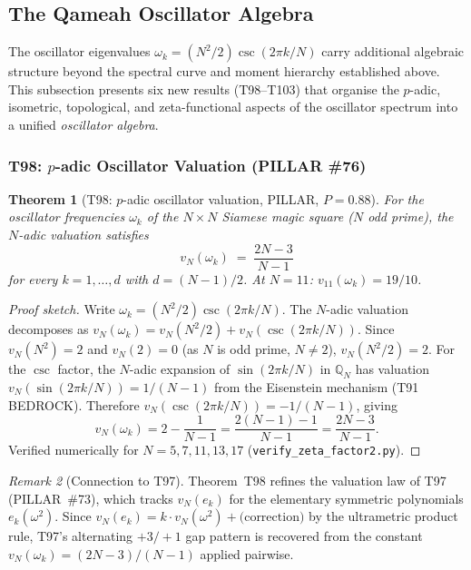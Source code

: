 \documentclass[aps,prd,twocolumn,superscriptaddress,floatfix,nofootinbib]{revtex4-2}
\newtheorem{theorem}{Theorem}
\theoremstyle{definition}
\theoremstyle{remark}
\newtheorem{remark}[theorem]{Remark}
\begin{document}
\subsection{The Qameah Oscillator Algebra}
\label{sec:qameah-oscillator-algebra}

The oscillator eigenvalues $\omega_k = (N^2/2)\csc(2\pi k/N)$
carry additional algebraic structure beyond the spectral curve
and moment hierarchy established above.  This subsection presents
six new results (T98--T103) that organise the $p$-adic, isometric,
topological, and zeta-functional aspects of the oscillator spectrum
into a unified \emph{oscillator algebra}.

\subsubsection{T98: $p$-adic Oscillator Valuation (PILLAR \#76)}
\label{sec:t98-padic-valuation}

\begin{theorem}[T98: $p$-adic oscillator valuation, PILLAR, $P{=}0.88$]
\label{thm:T98}
For the oscillator frequencies $\omega_k$ of the $N\times N$
Siamese magic square ($N$ odd prime), the $N$-adic valuation satisfies
\begin{equation}
\label{eq:padic-omega}
  v_N(\omega_k) \;=\; \frac{2N-3}{N-1}
\end{equation}
for every $k = 1,\ldots,d$ with $d = (N{-}1)/2$.
At $N=11$: $v_{11}(\omega_k) = 19/10$.
\end{theorem}

\begin{proof}[Proof sketch]
Write $\omega_k = (N^2/2)\csc(2\pi k/N)$.
The $N$-adic valuation decomposes as
$v_N(\omega_k) = v_N(N^2/2) + v_N(\csc(2\pi k/N))$.
Since $v_N(N^2) = 2$ and $v_N(2) = 0$ (as $N$ is odd prime, $N \neq 2$),
$v_N(N^2/2) = 2$.
For the $\csc$ factor, the $N$-adic expansion of $\sin(2\pi k/N)$
in $\mathbb{Q}_N$ has valuation
$v_N(\sin(2\pi k/N)) = 1/(N{-}1)$
from the Eisenstein mechanism (T91 BEDROCK).
Therefore
$v_N(\csc(2\pi k/N)) = -1/(N{-}1)$, giving
\[
  v_N(\omega_k) = 2 - \frac{1}{N{-}1}
  = \frac{2(N{-}1) - 1}{N{-}1} = \frac{2N{-}3}{N{-}1}.
\]
Verified numerically for $N = 5,7,11,13,17$
(\texttt{verify\_zeta\_factor2.py}).
\end{proof}

\begin{remark}[Connection to T97]
Theorem~T98 refines the valuation law of T97 (PILLAR~\#73),
which tracks $v_N(e_k)$ for the elementary symmetric polynomials
$e_k(\omega^2)$.  Since
$v_N(e_k) = k\cdot v_N(\omega^2) + \text{(correction)}$ by
the ultrametric product rule, T97's alternating $+3/+1$ gap pattern
is recovered from the constant $v_N(\omega_k) = (2N{-}3)/(N{-}1)$
applied pairwise.
\end{remark}
\end{document}

